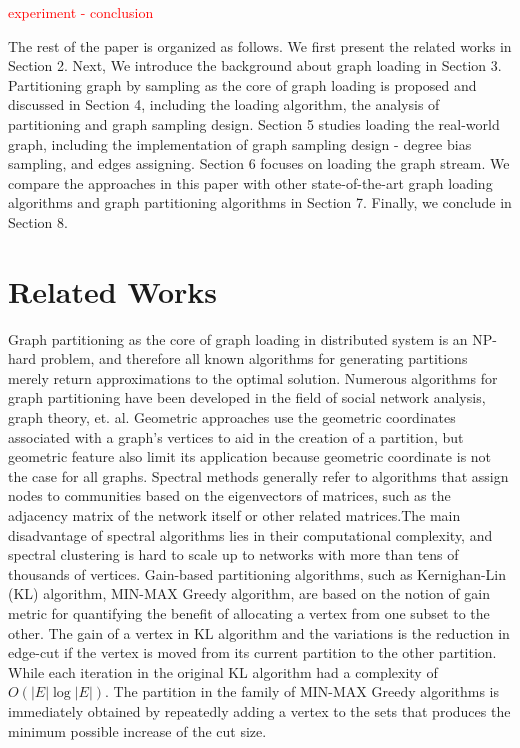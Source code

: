 \documentclass{sig-alternate-2013}
\begin{document}
\textcolor{red}{experiment - conclusion}

The rest of the paper is organized as follows. We first present the related works in Section 2. Next, We introduce the background about graph loading in Section 3. Partitioning graph by sampling as the core of graph loading is proposed and discussed in Section 4, including the loading algorithm, the analysis of partitioning and graph sampling design. Section 5 studies loading the real-world graph, including the implementation of graph sampling design - degree bias sampling, and edges assigning. Section 6 focuses on loading the graph stream. We compare the approaches in this paper with other state-of-the-art graph loading algorithms and graph partitioning algorithms in Section 7. Finally, we conclude in Section 8.

\section{Related Works}

Graph partitioning as the core of graph loading in distributed system is an NP-hard problem, and therefore all known algorithms for generating partitions merely return approximations to the optimal solution. Numerous algorithms for graph partitioning have been developed in the field of social network analysis, graph theory, et. al. Geometric approaches use the geometric coordinates associated with a graph's vertices to aid in the creation of a partition, but geometric feature also limit its application because geometric coordinate is not the case for all graphs. Spectral methods generally refer to algorithms that assign nodes to communities based on the eigenvectors of matrices, such as the adjacency matrix of the network itself or other related matrices\cite{Luxburg:spectralcluster}.The main disadvantage of spectral algorithms lies in their computational complexity, and spectral clustering is hard to scale up to networks with more than tens of thousands of vertices. Gain-based partitioning algorithms, such as Kernighan-Lin (KL) algorithm\cite{Fiduccia:klvar, Kernighan:kl}, MIN-MAX Greedy algorithm\cite{Battiti:minmaxgreedy, Laguna:greedy}, are based on the notion of gain metric for quantifying the benefit of allocating a vertex from one subset to the other. The gain of a vertex in KL algorithm and the variations is the reduction in edge-cut if the vertex is moved from its current partition to the other partition. While each iteration in the original KL algorithm had a complexity of $O(|E|\log{|E|})$. The partition in the family of MIN-MAX Greedy algorithms is immediately obtained by repeatedly adding a vertex to the sets that produces the minimum possible increase of the cut size.
\end{document}
